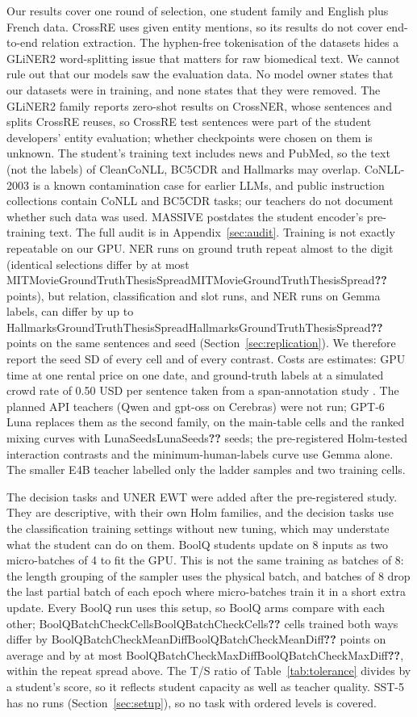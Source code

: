 \documentclass[11pt]{article}
\newcommand{\res}[1]{\ifcsname #1\endcsname\csname #1\endcsname\else\textbf{??}\fi}
\begin{document}
Our results cover one round of selection, one student family and English plus French data. CrossRE uses given entity mentions, so its results do not cover end-to-end relation extraction. The hyphen-free tokenisation of the datasets hides a GLiNER2 word-splitting issue that matters for raw biomedical text. We cannot rule out that our models saw the evaluation data. No model owner states that our datasets were in training, and none states that they were removed. The GLiNER2 family reports zero-shot results on CrossNER, whose sentences and splits CrossRE reuses, so CrossRE test sentences were part of the student developers' entity evaluation; whether checkpoints were chosen on them is unknown. The student's training text includes news and PubMed, so the text (not the labels) of CleanCoNLL, BC5CDR and Hallmarks may overlap. CoNLL-2003 is a known contamination case for earlier LLMs, and public instruction collections contain CoNLL and BC5CDR tasks; our teachers do not document whether such data was used. MASSIVE postdates the student encoder's pre-training text. The full audit is in Appendix~\ref{sec:audit}. Training is not exactly repeatable on our GPU. NER runs on ground truth repeat almost to the digit (identical selections differ by at most \res{MITMovieGroundTruthThesisSpread} points), but relation, classification and slot runs, and NER runs on Gemma labels, can differ by up to \res{HallmarksGroundTruthThesisSpread} points on the same sentences and seed (Section~\ref{sec:replication}). We therefore report the seed SD of every cell and of every contrast. Costs are estimates: GPU time at one rental price on one date, and ground-truth labels at a simulated crowd rate of 0.50 USD per sentence taken from a span-annotation study \citep{kasner2026spanannotators}. The planned API teachers (Qwen and gpt-oss on Cerebras) were not run; GPT-6 Luna replaces them as the second family, on the main-table cells and the ranked mixing curves with \res{LunaSeeds} seeds; the pre-registered Holm-tested interaction contrasts and the minimum-human-labels curve use Gemma alone. The smaller E4B teacher labelled only the ladder samples and two training cells.

The decision tasks and UNER EWT were added after the pre-registered study. They are descriptive, with their own Holm families, and the decision tasks use the classification training settings without new tuning, which may understate what the student can do on them. BoolQ students update on 8 inputs as two micro-batches of 4 to fit the GPU. This is not the same training as batches of 8: the length grouping of the sampler uses the physical batch, and batches of 8 drop the last partial batch of each epoch where micro-batches train it in a short extra update. Every BoolQ run uses this setup, so BoolQ arms compare with each other; \res{BoolQBatchCheckCells} cells trained both ways differ by \res{BoolQBatchCheckMeanDiff} points on average and by at most \res{BoolQBatchCheckMaxDiff}, within the repeat spread above. The T/S ratio of Table~\ref{tab:tolerance} divides by a student's score, so it reflects student capacity as well as teacher quality. SST-5 has no runs (Section~\ref{sec:setup}), so no task with ordered levels is covered.
\end{document}
